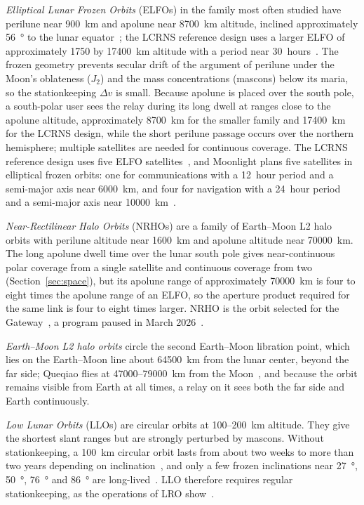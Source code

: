 \documentclass{IEEEoj}
\begin{document}
\emph{Elliptical Lunar Frozen Orbits} (ELFOs) in the family most often studied have perilune near \SI{900}{km} and apolune near \SI{8700}{km} altitude, inclined approximately \SI{56}{\degree} to the lunar equator~\cite{zhang_elfo_occlusion}; the LCRNS reference design uses a larger ELFO of approximately \SI{1750}{} by \SI{17400}{km} altitude with a period near \SI{30}{hours}~\cite{lcrns_ref_const}. The frozen geometry prevents secular drift of the argument of perilune under the Moon's oblateness ($J_2$) and the mass concentrations (mascons) below its maria, so the stationkeeping $\Delta v$ is small. Because apolune is placed over the south pole, a south-polar user sees the relay during its long dwell at ranges close to the apolune altitude, approximately \SI{8700}{km} for the smaller family and \SI{17400}{km} for the LCRNS design, while the short perilune passage occurs over the northern hemisphere; multiple satellites are needed for continuous coverage. The LCRNS reference design uses five ELFO satellites~\cite{lcrns_ref_const}, and Moonlight plans five satellites in elliptical frozen orbits: one for communications with a \SI{12}{hour} period and a semi-major axis near \SI{6000}{km}, and four for navigation with a \SI{24}{hour} period and a semi-major axis near \SI{10000}{km}~\cite{telespazio_moonlight}.

\emph{Near-Rectilinear Halo Orbits} (NRHOs) are a family of Earth--Moon L2 halo orbits with perilune altitude near \SI{1600}{km} and apolune altitude near \SI{70000}{km}. The long apolune dwell time over the lunar south pole gives near-continuous polar coverage from a single satellite and continuous coverage from two (Section~\ref{sec:space}), but its apolune range of approximately \SI{70000}{km} is four to eight times the apolune range of an ELFO, so the aperture product required for the same link is four to eight times larger. NRHO is the orbit selected for the Gateway~\cite{gateway_comm}, a program paused in March 2026~\cite{nasa_ignition2026}.

\emph{Earth--Moon L2 halo orbits} circle the second Earth--Moon libration point, which lies on the Earth--Moon line about \SI{64500}{km} from the lunar center, beyond the far side; Queqiao flies at \SI{47000}{}--\SI{79000}{km} from the Moon~\cite{chen_ce4_relay}, and because the orbit remains visible from Earth at all times, a relay on it sees both the far side and Earth continuously.

\emph{Low Lunar Orbits} (LLOs) are circular orbits at \SI{100}{}--\SI{200}{km} altitude. They give the shortest slant ranges but are strongly perturbed by mascons. Without stationkeeping, a \SI{100}{km} circular orbit lasts from about two weeks to more than two years depending on inclination~\cite{ramanan_llo}, and only a few frozen inclinations near \SI{27}{\degree}, \SI{50}{\degree}, \SI{76}{\degree} and \SI{86}{\degree} are long-lived~\cite{bell_lunar_orbits}. LLO therefore requires regular stationkeeping, as the operations of LRO show~\cite{lro_ka_analysis}.
\end{document}
